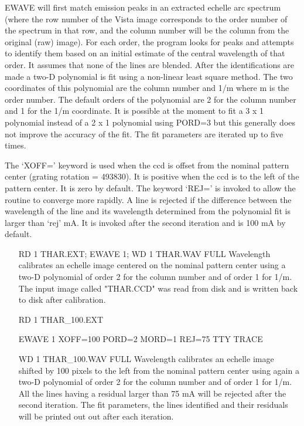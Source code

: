 EWAVE will first match emission peaks in an extracted echelle arc spectrum
(where the row number of the Vista image corresponds to the order number of
the spectrum in that row, and the column number will be the column from the
original (raw) image).  For each order, the program looks for peaks and
attempts to identify them based on an initial estimate of the central
wavelength of that order.  It assumes that none of the lines are blended.
After the identifications are made a two-D polynomial is fit using a
non-linear least square method.  The two coordinates of this polynomial are
the column number and 1/m where m is the order number.  The default orders
of the polynomial are 2 for the column number and 1 for the 1/m coordinate.
It is possible at the moment to fit a 3 x 1 polynomial instead of a 2 x 1
polynomial using PORD=3 but this generally does not improve the accuracy of
the fit.  The fit parameters are iterated up to five times.

The `XOFF=' keyword is used when the ccd is offset from the nominal pattern
center (grating rotation = 493830).  It is positive when the ccd is to the
left of the pattern center.  It is zero by default.  The keyword `REJ=' is
invoked to allow the routine to converge more rapidly.  A line is rejected
if the difference between the wavelength of the line and its wavelength
determined from the polynomial fit is larger than `rej' mA.  It is invoked
after the second iteration and is 100 mA by default.

\begin{itemize}
  \item[RD 1 THAR.EXT; EWAVE 1; WD 1 THAR.WAV FULL\hfill]{ Wavelength
       calibrates an echelle image centered on the nominal pattern center
       using a two-D polynomial of order 2 for the column number and of
       order 1 for 1/m.  The input image called "THAR.CCD" was read from
       disk and is written back to disk after calibration.}

  \item[RD 1 THAR\_100.EXT\hfill]{}

  \item[EWAVE 1 XOFF=100 PORD=2 MORD=1 REJ=75 TTY TRACE\hfill]{}

  \item[WD 1 THAR\_100.WAV FULL\hfill]{ Wavelength calibrates an echelle
       image shifted by 100 pixels to the left from the nominal pattern
       center using again a two-D polynomial of order 2 for the column
       number and of order 1 for 1/m.  All the lines having a residual
       larger than 75 mA will be rejected after the second iteration.  The
       fit parameters, the lines identified and their residuals will be
       printed out out after each iteration.}
\end{itemize}

